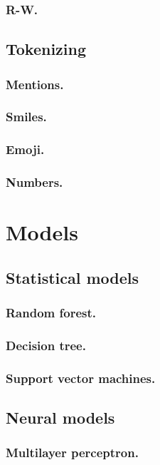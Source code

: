 \subsubsection{R-W.}

\subsection{Tokenizing}

\subsubsection{Mentions.}
\subsubsection{Smiles.}
\subsubsection{Emoji.}
\subsubsection{Numbers.}


\section{Models}

\subsection{Statistical models}

\subsubsection{Random forest.}
\subsubsection{Decision tree.}
\subsubsection{Support vector machines.}

\subsection{Neural models}

\subsubsection{Multilayer perceptron.}
